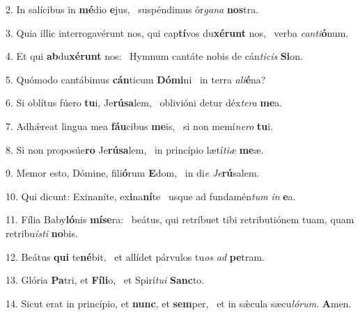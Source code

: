2. In salícibus in \textbf{mé}dio \textbf{e}jus, \ast\  suspéndimus ór\textit{ga}\textit{na} \textbf{nos}tra.\

3. Quia illic interrogavérunt nos, qui cap\textbf{tí}vos du\textbf{xé}\textbf{runt} nos, \ast\  verba \textit{can}\textit{ti}\textbf{ó}num.\

4. Et qui \textbf{ab}du\textbf{xé}\textbf{runt} nos: \ast\  Hymnum cantáte nobis de cán\textit{ti}\textit{cis} \textbf{Si}on.\

5. Quómodo cantábimus \textbf{cán}ticum \textbf{Dó}\textbf{mi}ni \ast\  in terra \textit{a}\textit{li}\textbf{é}na?\

6. Si oblítus fúero \textbf{tu}i, Je\textbf{rú}\textbf{sa}lem, \ast\  oblivióni detur déx\textit{te}\textit{ra} \textbf{me}a.\

7. Adhǽreat lingua mea \textbf{fáu}cibus \textbf{me}is, \ast\  si non memí\textit{ne}\textit{ro} \textbf{tu}i.\

8. Si non proposúe\textbf{ro} Je\textbf{rú}\textbf{sa}lem, \ast\  in princípio lætí\textit{ti}\textit{æ} \textbf{me}æ.\

9. Memor esto, Dómine, fili\textbf{ó}rum \textbf{E}dom, \ast\  in di\textit{e} \textit{Je}\textbf{rú}salem.\

10. Qui dicunt: Exinaníte, ex\textbf{i}na\textbf{ní}te \ast\  usque ad fundamén\textit{tum} \textit{in} \textbf{e}a.\

11. Fília Baby\textbf{ló}nis \textbf{mí}\textbf{se}ra: \ast\  beátus, qui retríbuet tibi retributiónem tuam, quam retribu\textit{ís}\textit{ti} \textbf{no}bis.\

12. Beátus \textbf{qui} te\textbf{né}bit, \ast\  et allídet párvulos tu\textit{os} \textit{ad} \textbf{pe}tram.\

13. Glória \textbf{Pa}tri, et \textbf{Fí}\textbf{li}o, \ast\  et Spirí\textit{tu}\textit{i} \textbf{Sanc}to.\

14. Sicut erat in princípio, et \textbf{nunc}, et \textbf{sem}per, \ast\  et in sǽcula sæcu\textit{ló}\textit{rum}. \textbf{A}men.\

